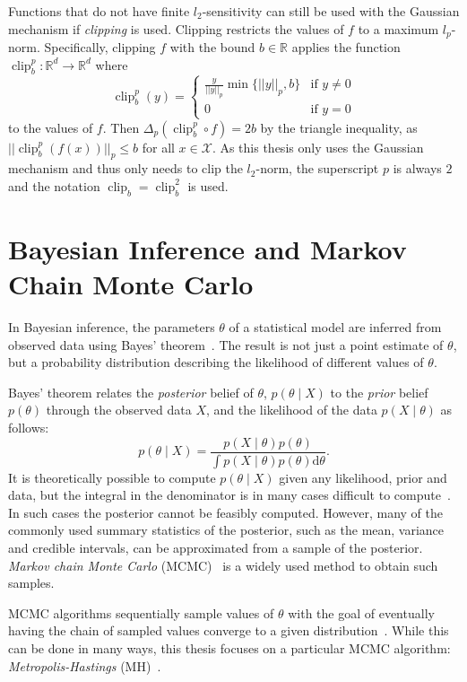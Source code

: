 \documentclass[english,twoside,openright]{HYgraduMLDS}
\newcommand{\R}{\mathbb{R}}
\newcommand{\dx}{\mathrm{d}}
\newcommand{\calx}{{\mathcal{X}}}
\DeclareMathOperator{\clip}{clip}
\begin{document}
Functions that do not have finite \(l_{2}\)-sensitivity can still be used with
the Gaussian mechanism if \emph{clipping} is used. Clipping restricts the
values of \(f\) to a maximum \(l_{p}\)-norm. Specifically, clipping
\(f\) with the bound \(b\in \R\) applies
the function \(\clip_{b}^{p}\colon \R^{d}\to \R^{d}\) where
\[
  \clip_{b}^{p}(y) =
  \begin{cases}
    \frac{y}{||y||_{p}}\min\{||y||_{p}, b\} & \text{if } y \neq 0\\
    0 & \text{if } y = 0
  \end{cases}
\]
to the values of \(f\). Then \(\Delta_{p}(\clip_{b}^{p} \circ f) = 2b\) by the
triangle inequality, as \(||\clip_{b}^{p}(f(x))||_{p} \leq b\) for
all \(x\in \calx\). As this thesis only uses the Gaussian mechanism and
thus only needs to clip the \(l_{2}\)-norm, the superscript \(p\) is always
\(2\) and the notation \(\clip_{b} = \clip_{b}^{2}\) is used.

\section{Bayesian Inference and Markov Chain Monte Carlo}\label{MCMC_background}

In Bayesian inference, the parameters \(\theta\) of a statistical model are
inferred from 
observed data using Bayes' theorem~\cite{BDA}. The result is not just a point estimate 
of \(\theta\), but a probability distribution describing the likelihood
of different values of \(\theta\).

Bayes' theorem relates the \emph{posterior} belief of \(\theta\),
\(p(\theta \mid X)\) to the \emph{prior} belief \(p(\theta)\) through the 
observed data \(X\), and the likelihood of the data \(p(X\mid \theta)\) as follows:
\[
    p(\theta \mid X) = \frac{p(X \mid \theta)p(\theta)}
    {\int p(X\mid \theta)p(\theta)\dx\theta}.
\]
It is theoretically possible to compute \(p(\theta \mid X)\) given any 
likelihood, prior and data, but the integral in the denominator is in many 
cases difficult to compute~\cite{BDA}. In such cases the posterior cannot be feasibly 
computed. However, many of the commonly used summary statistics of the posterior, 
such as the mean, variance and credible intervals, can be approximated from 
a sample of the posterior. \emph{Markov chain Monte Carlo}
(MCMC)~\cite{MRR53} is a widely used method to obtain such samples.

MCMC algorithms sequentially sample values of \(\theta\)
with the goal of eventually having the chain of sampled values converge to 
a given distribution~\cite{BDA}. While this can be done in many ways, this thesis 
focuses on a particular MCMC algorithm:
\emph{Metropolis-Hastings} (MH)~\cite{MRR53, Has70}.
\end{document}
